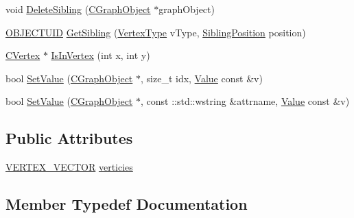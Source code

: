 \begin{DoxyCompactItemize}
void \hyperlink{class_n_m_1_1_o_d_b_1_1_c_vertex_table_a1f133ede0be1de9c552d98820e06eed7}{Delete\+Sibling} (\hyperlink{class_n_m_1_1_o_d_b_1_1_c_graph_object}{C\+Graph\+Object} $\ast$graph\+Object)
\item 
\hyperlink{namespace_n_m_1_1_o_d_b_a262b64fab56baaa96e18bac4ada88265}{O\+B\+J\+E\+C\+T\+U\+I\+D} \hyperlink{class_n_m_1_1_o_d_b_1_1_c_vertex_table_a9dcc57ca073291f976037029ae2eb1b6}{Get\+Sibling} (\hyperlink{namespace_n_m_1_1_o_d_b_a74e0c94daaeea6f7e783c03a8c921022}{Vertex\+Type} v\+Type, \hyperlink{namespace_n_m_1_1_o_d_b_a1b474aa7e937112cda42381969dcb55e}{Sibling\+Position} position)
\item 
\hyperlink{class_n_m_1_1_o_d_b_1_1_c_vertex}{C\+Vertex} $\ast$ \hyperlink{class_n_m_1_1_o_d_b_1_1_c_vertex_table_ae3f7e93df587a2ad0241e06fb8641c9f}{Is\+In\+Vertex} (int x, int y)
\item 
bool \hyperlink{class_n_m_1_1_o_d_b_1_1_c_vertex_table_ad6c21c25a002804c3255771d15a513bf}{Set\+Value} (\hyperlink{class_n_m_1_1_o_d_b_1_1_c_graph_object}{C\+Graph\+Object} $\ast$, size\+\_\+t idx, \hyperlink{class_n_m_1_1_o_d_b_1_1_value}{Value} const \&v)
\item 
bool \hyperlink{class_n_m_1_1_o_d_b_1_1_c_vertex_table_a1433c9bce4a02925cf39e0d13ed4d19b}{Set\+Value} (\hyperlink{class_n_m_1_1_o_d_b_1_1_c_graph_object}{C\+Graph\+Object} $\ast$, const \+::std\+::wstring \&attrname, \hyperlink{class_n_m_1_1_o_d_b_1_1_value}{Value} const \&v)
\end{DoxyCompactItemize}
\subsection*{Public Attributes}
\begin{DoxyCompactItemize}
\item 
\hyperlink{class_n_m_1_1_o_d_b_1_1_c_vertex_table_aad307ea0f7106397e4da74c082c3aaf7}{V\+E\+R\+T\+E\+X\+\_\+\+V\+E\+C\+T\+O\+R} \hyperlink{class_n_m_1_1_o_d_b_1_1_c_vertex_table_af3e5fc03a2aa79bb8d4e2cac3f445a96}{verticies}
\end{DoxyCompactItemize}


\subsection{Member Typedef Documentation}
\hypertarget{class_n_m_1_1_o_d_b_1_1_c_vertex_table_aad307ea0f7106397e4da74c082c3aaf7}{}

